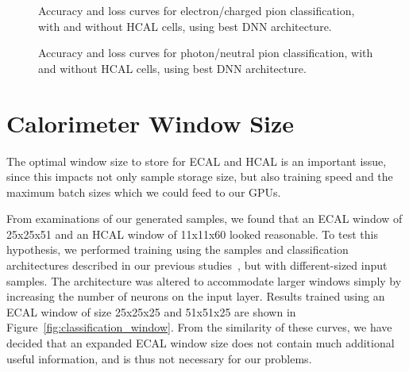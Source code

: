 \begin{figure}[htbp]
\centering
\caption{Accuracy and loss curves for electron/charged pion classification, with and without HCAL cells, using best DNN architecture.}
\label{fig:HCAL_study_elechpi}
\end{figure}

\begin{figure}[htbp]
\centering
\caption{Accuracy and loss curves for photon/neutral pion classification, with and without HCAL cells, using best DNN architecture.}
\label{fig:HCAL_study_gammapi0}
\end{figure}

\section{Calorimeter Window Size}\label{app:window_size}

The optimal window size to store for ECAL and HCAL is an important issue, since this impacts not only sample storage size, but also training speed and the maximum batch sizes which we could feed to our GPUs. 

From examinations of our generated samples, we found that an ECAL window of 25x25x51 and an HCAL window of 11x11x60 looked reasonable. To test this hypothesis, we performed training using the samples and classification architectures described in our previous studies~\cite{NIPS}, but with different-sized input samples. The architecture was altered to accommodate larger windows simply by increasing the number of neurons on the input layer. Results trained using an ECAL window of size 25x25x25 and 51x51x25 are shown in Figure~\ref{fig:classification_window}. From the similarity of these curves, we have decided that an expanded ECAL window size does not contain much additional useful information, and is thus not necessary for our problems.

\begin{figure*}[htbp]
\centering
\caption{Training history for different choices of the input 3D array zise: Accuracy (top) and loss (bottom) as a function of the training batch for photon/neutral pion classification, using a 25x25x25 (left) and 51x51x25 (right) ECAL window size.\label{fig:classification_window}}
\end{figure*}

